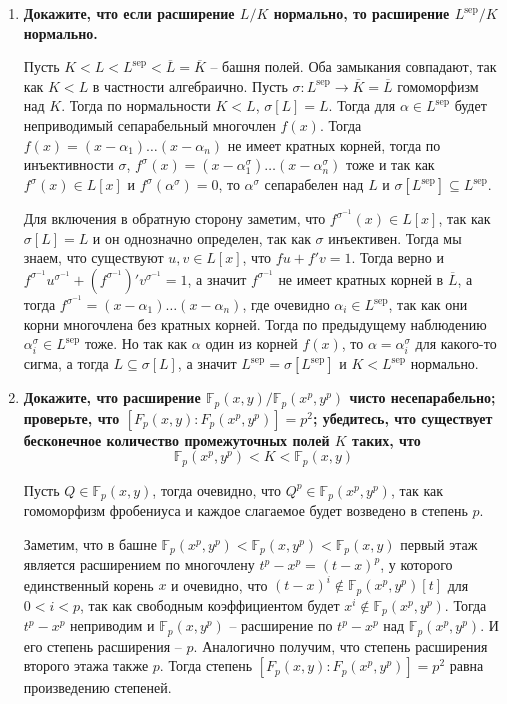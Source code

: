 \documentclass{article}
\begin{document}
\begin{enumerate}
    \item \textbf{Докажите, что если расширение $L/K$ нормально, то расширение
        $L^\text{sep}/K$ нормально.}

        Пусть $K<L<L^\text{sep}<\overline L=\overline K$ – башня полей. Оба
        замыкания совпадают, так как $K<L$ в частности алгебраично. Пусть $
        \sigma:L^\text{sep}\rightarrow\overline K=\overline L$ гомоморфизм над
        $K$. Тогда по нормальности $K<L$, $\sigma[L]=L$. Тогда для $\alpha\in
        L^\text{sep}$ будет неприводимый сепарабельный многочлен $f(x)$. Тогда
        $f(x)=(x-\alpha_1)\ldots(x-\alpha_n)$ не имеет кратных корней, тогда
        по инъективности $\sigma$, $f^\sigma(x)=(x-\alpha_1^\sigma)\ldots(x-
        \alpha_n^\sigma)$ тоже и так как $f^\sigma(x)\in L[x]$ и $f^\sigma(\alpha
        ^\sigma)=0$, то $\alpha^\sigma$ сепарабелен над $L$ и $\sigma[L^\text{sep}]
        \subseteq L^\text{sep}$.

        Для включения в обратную сторону заметим, что $f^{\sigma^{-1}}(x)\in L[x]$,
        так как $\sigma[L]=L$ и он однозначно определен, так как $\sigma$ инъективен.
        Тогда мы знаем, что существуют $u,v\in L[x]$, что $fu+f'v=1$. Тогда верно
        и $f^{\sigma^{-1}} u^{\sigma^{-1}}+(f^{\sigma^{-1}})'v^{\sigma^{-1}}=1$,
        а значит $f^{\sigma^{-1}}$ не имеет кратных корней в $\overline L$, а
        тогда $f^{\sigma^{-1}}=(x-\alpha_1)\ldots(x-\alpha_n)$, где очевидно
        $\alpha_i\in L^\text{sep}$, так как они корни многочлена без кратных
        корней. Тогда по предыдущему наблюдению $\alpha_i^\sigma\in L^\text{sep}$
        тоже. Но так как $\alpha$ один из корней $f(x)$, то $\alpha=\alpha_i^\sigma$
        для какого-то сигма, а тогда $L\subseteq \sigma[L]$, а значит
        $L^\text{sep}=\sigma[L^\text{sep}]$ и $K<L^\text{sep}$ нормально. 

    \item \textbf{Докажите, что расширение $\mathbb{F}_p(x, y)/\mathbb{F}_p(x^p,
        y^p)$ чисто несепарабельно; проверьте, что $[F_p(x,y) : F_p(x^p,y^p)] =
        p^2$; убедитесь, что существует бесконечное количество промежуточных
        полей $K$ таких, что
        \[\mathbb{F}_p(x^p, y^p)<K<\mathbb{F}_p(x,y)\]
        }

        Пусть $Q\in\mathbb{F}_p(x,y)$, тогда очевидно, что $Q^p\in\mathbb{F}_p(x^p,y^p)$,
        так как гомоморфизм фробениуса и каждое слагаемое будет возведено в
        степень $p$.

        Заметим, что в башне $\mathbb{F}_p(x^p,y^p)<\mathbb{F}_p(x,y^p)<
        \mathbb{F}_p(x,y)$ первый этаж является расширением по многочлену
        $t^p-x^p=(t-x)^p$, у которого единственный корень $x$ и очевидно, что
        $(t-x)^i\notin\mathbb{F}_p(x^p,y^p)[t]$ для $0<i<p$, так как свободным
        коэффициентом будет $x^i\notin\mathbb{F}_p(x^p,y^p)$. Тогда $t^p-x^p$
        неприводим и $\mathbb{F}_p(x,y^p)$ – расширение по $t^p-x^p$ над $
        \mathbb{F}_p(x^p,y^p)$. И его степень расширения – $p$. Аналогично
        получим, что степень расширения второго этажа также $p$. Тогда степень
        $[F_p(x,y) : F_p(x^p,y^p)]=p^2$ равна произведению степеней.


\end{enumerate}
\end{document}
